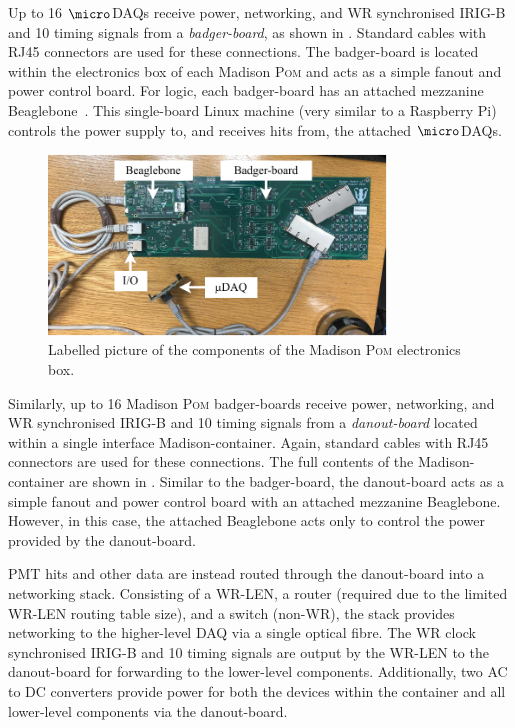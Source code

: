 Up to 16 $\micro$DAQs receive power, networking, and WR synchronised IRIG-B and
\SI{10}{} timing signals from a \emph{badger-board}, as shown in
. Standard cables with RJ45 connectors are used for these
connections. The badger-board is located within the electronics box of each Madison \textsc{Pom}
and acts as a simple fanout and power control board. For logic, each badger-board has an attached
mezzanine Beaglebone~\cite{beagle2020}. This single-board Linux machine (very similar to a
Raspberry Pi) controls the power supply to, and receives hits from, the attached $\micro$DAQs.

\begin{figure} %
    \includegraphics[width=0.8\textwidth]{diagrams/5-daq/madison_plane.pdf}
    \caption[Labelled picture of the components of the Madison \textsc{Pom} electronics box]
    {Labelled picture of the components of the Madison \textsc{Pom} electronics box.}
    \label{fig:madison_plane}
\end{figure}

Similarly, up to 16 Madison \textsc{Pom} badger-boards receive power, networking, and WR
synchronised IRIG-B and \SI{10}{} timing signals from a \emph{danout-board} located
within a single interface Madison-container. Again, standard cables with RJ45 connectors are used
for these connections. The full contents of the Madison-container are shown in
. Similar to the badger-board, the danout-board acts as a simple fanout
and power control board with an attached mezzanine Beaglebone. However, in this case, the attached
Beaglebone acts only to control the power provided by the danout-board.

PMT hits and other data are instead routed through the danout-board into a networking stack.
Consisting of a WR-LEN, a router (required due to the limited WR-LEN routing table size), and a
switch (non-WR), the stack provides networking to the higher-level DAQ via a single optical fibre.
The WR clock synchronised IRIG-B and \SI{10}{} timing signals are output by the WR-LEN
to the danout-board for forwarding to the lower-level components. Additionally, two AC to DC
converters provide power for both the devices within the container and all lower-level components
via the danout-board.

